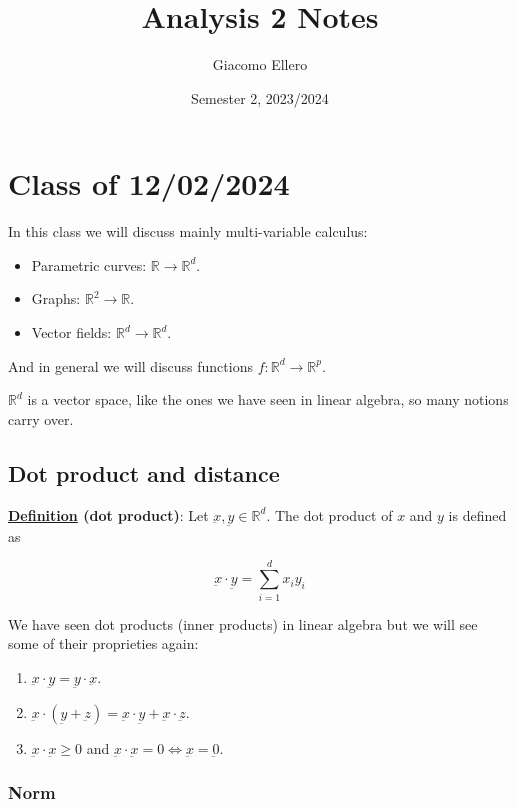 \documentclass[10pt]{extarticle}
\title{Analysis 2 Notes}
\author{Giacomo Ellero}
\date{Semester 2, 2023/2024}
\newcommand{\R}{\mathbb{R}}
\newcommand{\munderbar}[1]{\underbar{\ensuremath{#1}}}
\begin{document}
\maketitle
\tableofcontents
\clearpage

\section{Class of 12/02/2024}

In this class we will discuss mainly multi-variable calculus:
\begin{itemize}
    \item Parametric curves: $\R \to \R^d$.
    \item Graphs: $\R^2 \to \R$.
    \item Vector fields: $\R^d \to \R^d$.
\end{itemize}

And in general we will discuss functions $f: \R^d \to \R^p$.

$\R^d$ is a vector space, like the ones we have seen in linear algebra, so many notions carry over.

\subsection{Dot product and distance}

\textbf{\underline{Definition} (dot product)}: Let $\munderbar{x}, \munderbar{y} \in \R^d$. The dot product of $x$ and $y$ is defined as

$$
    \munderbar{x} \cdot \munderbar{y} = \sum_{i=1}^d x_i y_i
$$

We have seen dot products (inner products) in linear algebra but we will see some of their proprieties again:
\begin{enumerate}
    \item $\munderbar{x} \cdot \munderbar{y} = \munderbar{y} \cdot \munderbar{x}$.
    \item $\munderbar{x} \cdot (\munderbar{y} + \munderbar{z}) = \munderbar{x} \cdot \munderbar{y} + \munderbar{x} \cdot \munderbar{z}$.
    \item $\munderbar{x} \cdot \munderbar{x} \geq 0$ and $\munderbar{x} \cdot \munderbar{x} = 0 \iff \munderbar{x} = \munderbar{0}$.
\end{enumerate}

\subsubsection{Norm}
\end{document}
